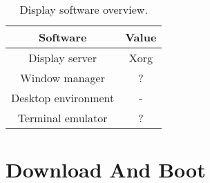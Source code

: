 \documentclass[10pt, a4paper, onecolumn, oneside, titlepage, openany]{book}
\begin{document}
\begin{table}[!ht]
\centering
\begin{tabular}{|c|c|}
    \hline
    \textbf{Software} & \textbf{Value} \\
    \hline
    Display server & Xorg\\
    Window manager & ?\\
    Desktop environment & -\\
    Terminal emulator & ?\\
    \hline
\end{tabular}
\caption{Display software overview.}
\label{table:display_software_overview}
\end{table}



\chapter{Download And Boot}
\end{document}
